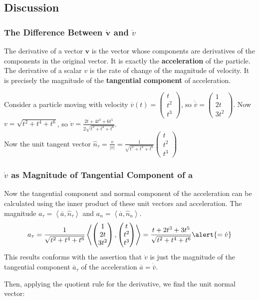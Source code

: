 \subsection{Discussion}
\begin{frame}
\frametitle{The Difference Between $\dot{\mathbf{v}}$ and $\dot v$}
The derivative of a \alert{vector} $\mathbf{v}$ is the \alert{vector} whose components are \alert{derivatives of the components} in the original vector. It is exactly the \alert{\textbf{acceleration}} of the particle. The derivative of a \alert{scalar} $v$ is the \alert{rate of change} of the \alert{magnitude} of velocity. It is precisely the magnitude of the \alert{\textbf{tangential component}} of acceleration.
\begin{example}
Consider a particle moving with velocity $\overline{v}(t)=\left(\begin{matrix}t\\t^2\\t^3\end{matrix}\right)$, so $\dot{\overline{v}}=\left(\begin{matrix}1\\2t\\3t^2\end{matrix}\right)$. Now $v=\sqrt{t^2+t^4+t^6}$, so $\dot v=\frac{2t+4t^3+6t^5}{2\sqrt{t^2+t^4+t^6}}$.\\
Now the \alert{unit tangent vector} $\hat n_\tau=\frac{v}{|v|}=\frac{1}{\sqrt{t^2+t^4+t^6}}\left(\begin{matrix}t\\t^2\\t^3\end{matrix}\right)$
\end{example}
\end{frame}
\begin{frame}
\begin{example}
\frametitle{$\dot v$ as Magnitude of Tangential Component of $\mathbf{a}$}
Now the \alert{tangential} component and \alert{normal} component of the acceleration can be calculated using the \alert{inner product} of these unit vectors and \alert{acceleration}. The \alert{magnitude} $a_\tau=\left<\overline{a},\hat n_\tau\right>$ and $a_n=\left<\overline{a},\hat n_n\right>$.
\[a_\tau=\frac{1}{\sqrt{t^2+t^4+t^6}}\left<\left(\begin{matrix}1\\2t\\3t^2\end{matrix}\right),\left(\begin{matrix}t\\t^2\\t^3\end{matrix}\right)\right>=\frac{t+2t^3+3t^5}{\sqrt{t^2+t^4+t^6}}\alert{=\dot v}\]
This results conforms with the assertion that \alert{$\dot v$} is just the \alert{magnitude} of the \alert{tangential component $\overline{a}_\tau$} of the \alert{acceleration $\overline{a}=\dot{\overline{v}}$}.
\end{example}
Then, applying the \alert{quotient rule} for the derivative, we find the \alert{unit normal vector}:
\end{frame}
